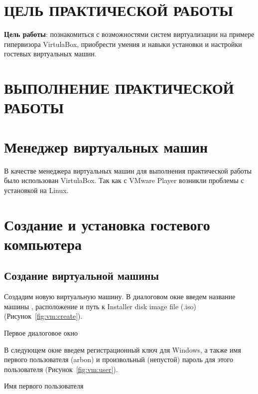 \section*{\LARGE ЦЕЛЬ ПРАКТИЧЕСКОЙ РАБОТЫ}

\textbf{Цель работы}: познакомиться с возможностями систем виртуализации
на примере гипервизора VirtulaBox,
приобрести умения и навыки установки и настройки гостевых виртуальных машин.

\clearpage

\section*{\LARGE ВЫПОЛНЕНИЕ ПРАКТИЧЕСКОЙ РАБОТЫ}

\section{Менеджер виртуальных машин}

В качестве менеджера виртуальных машин для выполнения практической работы
было использован VirtulaBox. Так как с VMware Player возникли проблемы
с установкой на Linux.

\clearpage

\section{Создание и установка гостевого компьютера}

\subsection{Создание виртуальной машины}

Создадим новую виртуальную машину.
В диалоговом окне введем название машины
, расположение и путь к Installer disk image file (.iso)
(Рисунок~\ref{fig:vm:create}).

\begin{image}
	\caption{Первое диалоговое окно}
	\label{fig:vm:create}
\end{image}

В следующем окне введем регистрационный ключ для Windows, а также имя
первого пользователя (arbon) и произвольный (непустой) пароль
для этого пользователя (Рисунок~\ref{fig:vm:user}).

\begin{image}
	\caption{Имя первого пользователя}
	\label{fig:vm:user}
\end{image}

